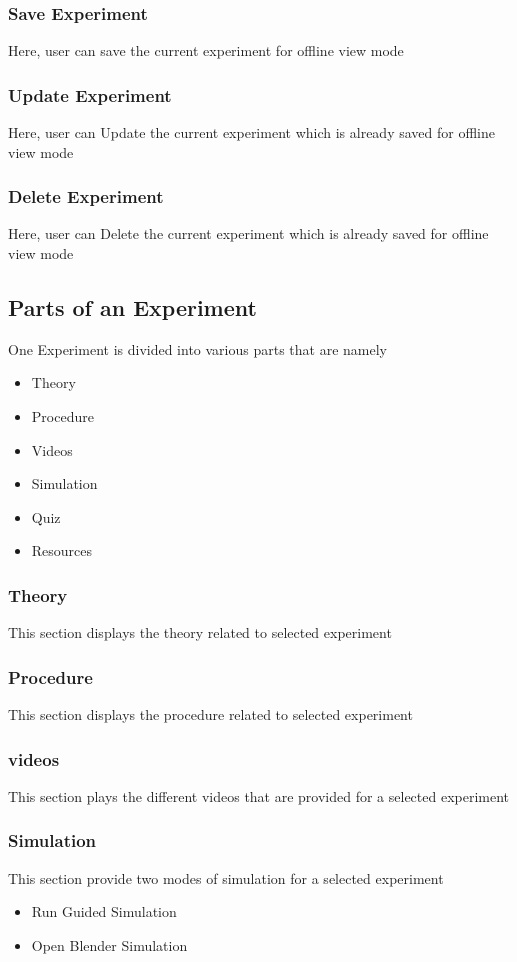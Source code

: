 \documentclass[12pt]{report}
\begin{document}
\subsubsection{Save Experiment}
Here, user can save the current experiment for offline view mode

\subsubsection{Update Experiment}
Here, user can Update the current experiment which is already saved for offline view mode

\subsubsection{Delete Experiment}
Here, user can Delete the current experiment which is already saved for offline view mode


\subsection{Parts of an Experiment}
One Experiment is divided into various parts that are namely
\begin{itemize}
\item Theory
\item Procedure
\item Videos
\item Simulation
\item Quiz
\item Resources
\end{itemize}

\subsubsection{Theory}
This section displays the theory related to selected experiment

\subsubsection{Procedure}
This section displays the procedure related to selected experiment

\subsubsection{videos}
This section plays the different videos that are provided for a selected experiment

\subsubsection{Simulation}
This section provide two modes of simulation for a selected experiment
\begin{itemize}
\item Run Guided Simulation
\item Open Blender Simulation
\end{itemize}
\end{document}
